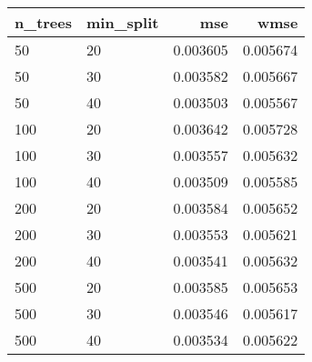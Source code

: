 \begin{tabular}{llrr}
\toprule
n\_trees & min\_split &      mse &     wmse \\
\midrule
     50 &        20 & 0.003605 & 0.005674 \\
     50 &        30 & 0.003582 & 0.005667 \\
     50 &        40 & 0.003503 & 0.005567 \\
    100 &        20 & 0.003642 & 0.005728 \\
    100 &        30 & 0.003557 & 0.005632 \\
    100 &        40 & 0.003509 & 0.005585 \\
    200 &        20 & 0.003584 & 0.005652 \\
    200 &        30 & 0.003553 & 0.005621 \\
    200 &        40 & 0.003541 & 0.005632 \\
    500 &        20 & 0.003585 & 0.005653 \\
    500 &        30 & 0.003546 & 0.005617 \\
    500 &        40 & 0.003534 & 0.005622 \\
\bottomrule
\end{tabular}
